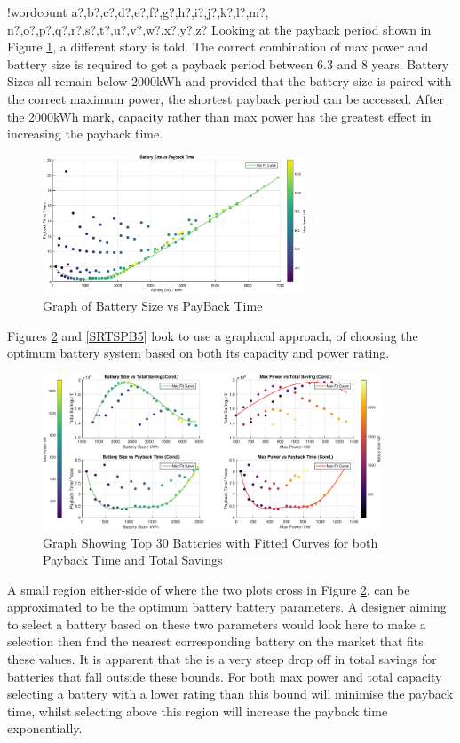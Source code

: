 \documentclass[fontsize=9.5pt]{extarticle}
\numberwithin{figure}{section} %
\newcounter{words}
\newenvironment{counted}{%
  \setcounter{words}{0}
  \SearchList!{wordcount}{\stepcounter{words}}
    {a?,b?,c?,d?,e?,f?,g?,h?,i?,j?,k?,l?,m?,
    n?,o?,p?,q?,r?,s?,t?,u?,v?,w?,x?,y?,z?}
  \UndoBoundary{'}
  \SearchOrder{p;}}{%
  \StopSearching}
\begin{document}
\begin{counted}
Looking at the payback period shown in Figure \ref{SRPB2}, a different
story is told. The correct combination of max power and battery size is
required to get a payback period between 6.3 and 8 years. Battery Sizes
all remain below 2000kWh and provided that the battery size is paired
with the correct maximum power, the shortest payback period can be
accessed. After the 2000kWh mark, capacity rather than max power has the
greatest effect in increasing the payback time.

\begin{figure}[H]
 \centering
 \includegraphics[trim = 0 0 0 0, clip, width=0.7\textwidth]{SRPB2.eps}
 \caption{Graph of Battery Size vs PayBack Time}
 \label{SRPB2}
\end{figure}

Figures \ref{SPA2} and \ref{SRTSPB5} look to use a graphical approach,
of choosing the optimum battery system based on both its capacity and
power rating.

\begin{figure}[H]
\centering
\includegraphics[trim = 0 0 0 0, clip, width=0.9\textwidth]{SPA2.eps}
\caption{Graph Showing Top 30 Batteries with Fitted Curves for both Payback Time and Total Savings}
\label{SPA2}
\end{figure}

A small region either-side of where the two plots cross in Figure
\ref{SPA2}, can be approximated to be the optimum battery battery
parameters. A designer aiming to select a battery based on these two
parameters would look here to make a selection then find the nearest
corresponding battery on the market that fits these values. It is
apparent that the is a very steep drop off in total savings for
batteries that fall outside these bounds. For both max power and total
capacity selecting a battery with a lower rating than this bound will
minimise the payback time, whilst selecting above this region will
increase the payback time exponentially.


\end{counted}
\end{document}
